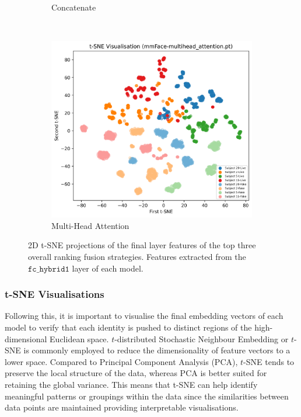 \documentclass{mpaper}
\begin{document}
\begin{figure}[!t]
\begin{subfigure}[b]{0.32\textwidth}
        \caption{Concatenate}
        \label{fig:tsne_concatenate}
    \end{subfigure}
    ~\hspace{0.01cm}
    \begin{subfigure}[b]{0.32\textwidth}
        \includegraphics[width=1.06\textwidth]{figures/tsne_multihead_attention.png}
        \caption{Multi-Head Attention}
        \label{fig:tsne_multihead_attention}
    \end{subfigure}
    \vspace{0.3cm}
    \caption{2D t-SNE projections of the final layer features of the top three overall ranking fusion strategies. Features extracted from the $\mathtt{fc\_hybrid1}$ layer of each model.}
    \vspace{-0.1cm}
\end{figure}

\subsubsection{t-SNE Visualisations}
Following this, it is important to visualise the final embedding vectors of each model to verify that each identity is pushed to distinct regions of the high-dimensional Euclidean space. $t$-distributed Stochastic Neighbour Embedding or $t$-SNE \cite{van2008visualizing} is commonly employed to reduce the dimensionality of  feature vectors to a lower space. Compared to Principal Component Analysis (PCA), $t$-SNE tends to preserve the local structure of the data, whereas PCA is better suited for retaining the global variance. This means that t-SNE can help identify meaningful patterns or groupings within the data since the similarities between data points are maintained providing interpretable visualisations.
\end{document}
